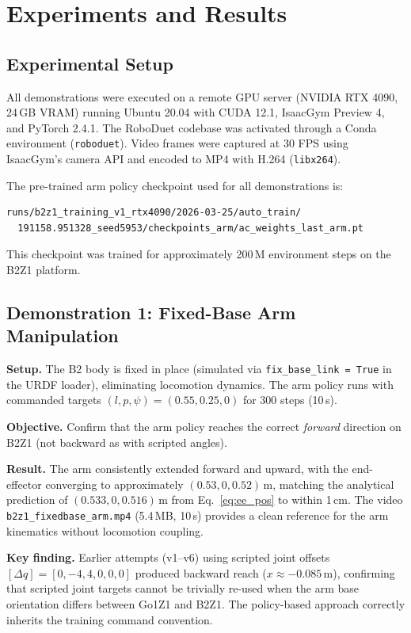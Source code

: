 
\chapter{Experiments and Results}
\label{chp:results}

\section{Experimental Setup}

All demonstrations were executed on a remote GPU server
(NVIDIA RTX 4090, 24\,GB VRAM) running Ubuntu 20.04 with
CUDA 12.1, IsaacGym Preview 4, and PyTorch 2.4.1.
The RoboDuet codebase was activated through a Conda environment
(\texttt{roboduet}).
Video frames were captured at 30 FPS using IsaacGym's camera API
and encoded to MP4 with H.264 (\texttt{libx264}).

The pre-trained arm policy checkpoint used for all demonstrations is:
\begin{verbatim}
runs/b2z1_training_v1_rtx4090/2026-03-25/auto_train/
  191158.951328_seed5953/checkpoints_arm/ac_weights_last_arm.pt
\end{verbatim}
This checkpoint was trained for approximately 200\,M environment steps
on the B2Z1 platform.

\section{Demonstration 1: Fixed-Base Arm Manipulation}
\label{sec:demo1}

\textbf{Setup.} The B2 body is fixed in place (simulated via
\texttt{fix\_base\_link = True} in the URDF loader), eliminating
locomotion dynamics.  The arm policy runs with commanded targets
$(l, p, \psi) = (0.55, 0.25, 0)$ for 300 steps (10\,s).

\textbf{Objective.} Confirm that the arm policy reaches the correct
\emph{forward} direction on B2Z1 (not backward as with scripted angles).

\textbf{Result.} The arm consistently extended forward and upward,
with the end-effector converging to approximately
$(0.53, 0, 0.52)$\,m, matching the analytical prediction of
$(0.533, 0, 0.516)$\,m from Eq.~\eqref{eq:ee_pos} to within 1\,cm.
The video \texttt{b2z1\_fixedbase\_arm.mp4} (5.4\,MB, 10\,s) provides
a clean reference for the arm kinematics without locomotion coupling.

\textbf{Key finding.}  Earlier attempts (v1--v6) using scripted joint
offsets $[\Delta q] = [0, -4, 4, 0, 0, 0]$ produced backward reach
($x \approx -0.085$\,m), confirming that scripted joint targets cannot
be trivially re-used when the arm base orientation differs between Go1Z1
and B2Z1.  The policy-based approach correctly inherits the training
command convention.

